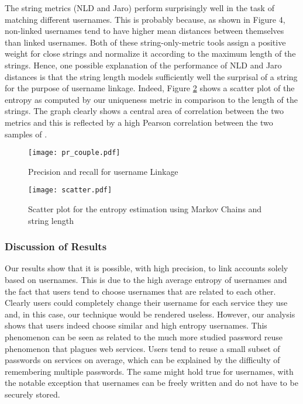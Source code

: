 \documentclass[letterpaper]{sig-alternate}
\begin{document}
The string metrics (NLD and Jaro) perform surprisingly well in the task of matching different
usernames. This is probably because, as shown in Figure 4, non-linked
usernames tend to have higher mean distances between themselves than linked
usernames.
Both of these string-only-metric tools assign a positive weight for close strings
and normalize it according to the maximum length of the strings.
Hence, one possible explanation of the performance of NLD and Jaro distances
is that the string length models sufficiently well the surprisal of a string
for the purpose of username linkage.
Indeed, Figure \ref{fig:scatter} shows a scatter plot of the entropy as computed
by our uniqueness metric in comparison to the length of the strings.
The graph clearly shows a central area of correlation between the two metrics and
this is reflected by a high Pearson correlation between the two samples of .

\begin{figure} [ht!] \centering
\texttt{[image: pr\_couple.pdf]}
\caption{Precision and recall for username Linkage}
\label{fig:pr_couples}
\end{figure}

\begin{figure} [tb] \centering
\texttt{[image: scatter.pdf]}
\caption{Scatter plot for the entropy estimation using Markov Chains and string length}
\label{fig:scatter}
\end{figure}







\subsubsection{Discussion of Results}

Our results show that it is possible, with high precision, to link
accounts solely based on usernames. This is due to the high average entropy
of usernames and the fact that users tend to choose usernames that are related
to each other.
Clearly users could completely change their username for each service they
use and, in this case, our technique would be rendered useless.
However, our analysis shows that users indeed choose similar and
high entropy usernames. 
This phenomenon can be seen as related to the much more
studied password reuse phenomenon \cite{1242661} that plagues web services.
Users tend to reuse a small subset of passwords on  services on average, which can be explained
by the difficulty of remembering multiple passwords. 
The same might hold true for usernames, with the notable exception that
usernames can be freely written and do not have to be securely stored.
\end{document}
